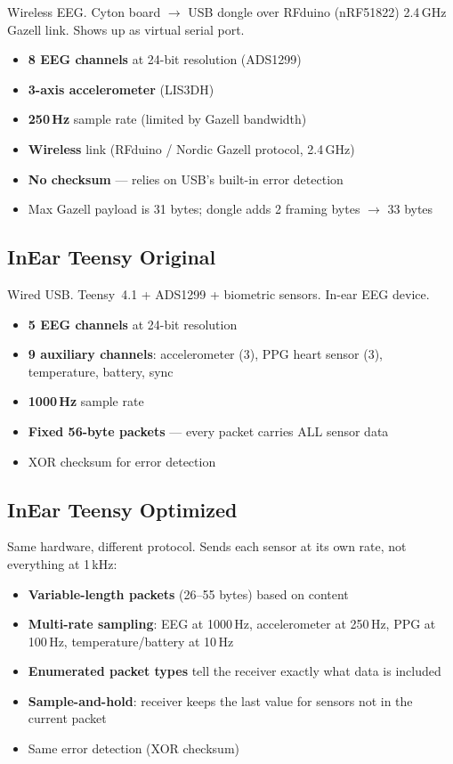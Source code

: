 \documentclass[11pt,a4paper]{article}
\begin{document}
Wireless EEG. Cyton board $\to$ USB dongle over RFduino (nRF51822) 2.4\,GHz Gazell link. Shows up as virtual serial port.

\begin{itemize}
    \item \textbf{8 EEG channels} at 24-bit resolution (ADS1299)
    \item \textbf{3-axis accelerometer} (LIS3DH)
    \item \textbf{250\,Hz} sample rate (limited by Gazell bandwidth)
    \item \textbf{Wireless} link (RFduino / Nordic Gazell protocol, 2.4\,GHz)
    \item \textbf{No checksum} --- relies on USB's built-in error detection
    \item Max Gazell payload is 31 bytes; dongle adds 2 framing bytes $\rightarrow$ 33 bytes
\end{itemize}

\subsection{InEar Teensy Original}

Wired USB. Teensy~4.1 + ADS1299 + biometric sensors. In-ear EEG device.

\begin{itemize}
    \item \textbf{5 EEG channels} at 24-bit resolution
    \item \textbf{9 auxiliary channels}: accelerometer (3), PPG heart sensor (3), temperature, battery, sync
    \item \textbf{1000\,Hz} sample rate
    \item \textbf{Fixed 56-byte packets} --- every packet carries ALL sensor data
    \item XOR checksum for error detection
\end{itemize}

\subsection{InEar Teensy Optimized}

Same hardware, different protocol. Sends each sensor at its own rate, not everything at 1\,kHz:

\begin{itemize}
    \item \textbf{Variable-length packets} (26--55 bytes) based on content
    \item \textbf{Multi-rate sampling}: EEG at 1000\,Hz, accelerometer at 250\,Hz, PPG at 100\,Hz, temperature/battery at 10\,Hz
    \item \textbf{Enumerated packet types} tell the receiver exactly what data is included
    \item \textbf{Sample-and-hold}: receiver keeps the last value for sensors not in the current packet
    \item Same error detection (XOR checksum)
\end{itemize}
\end{document}
